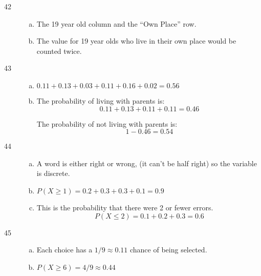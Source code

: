 \documentclass[letterpaper, landscape]{exam}
\begin{document}
\begin{description}
\begin{enumerate}[(a)]
        \end{enumerate}

      \item[42]
        \begin{enumerate}[(a)]
          \item The 19 year old column and the ``Own Place'' row.

          \item The value for 19 year olds who live in their own place would be
            counted twice.

        \end{enumerate}  

      \item[43]
        \begin{enumerate}[(a)]
          \item $0.11 + 0.13 + 0.03 + 0.11 + 0.16 + 0.02 = 0.56$

          \item The probability of living with parents is:
            \[
              0.11 + 0.13 + 0.11 + 0.11 = 0.46
            \]

            The probability of not living with parents is:
            \[
              1 - 0.46 = \boxed{ 0.54 }
            \]
        \end{enumerate}  

      \item[44]
        \begin{enumerate}[(a)]
          \item A word is either right or wrong, (it can't be half right) so the
            variable is discrete.

          \item $P(X \geq 1) = 0.2 + 0.3 + 0.3 + 0.1 = 0.9$

          \item This is the probability that there were 2 or fewer errors.
          \[
            P(X \leq 2) = 0.1 + 0.2 + 0.3 = 0.6
          \]
        \end{enumerate}  

      \item[45]
        \begin{enumerate}[(a)]
          \item Each choice has a $1/9 \approx \boxed{ 0.11 }$ chance of being selected.
          \item $P(X \geq 6) = 4/9 \approx \boxed{ 0.44 }$
        \end{enumerate}  


\end{description}
\end{document}
